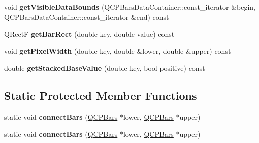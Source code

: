 \begin{DoxyCompactItemize}
\item 
\mbox{\label{class_q_c_p_bars_ac8b6b514a665a7bff4fb080413ba996a}} 
void {\bfseries get\+Visible\+Data\+Bounds} (Q\+C\+P\+Bars\+Data\+Container\+::const\+\_\+iterator \&begin, Q\+C\+P\+Bars\+Data\+Container\+::const\+\_\+iterator \&end) const
\item 
\mbox{\label{class_q_c_p_bars_a01b87e38e5d5089d214646d2af7896ea}} 
Q\+RectF {\bfseries get\+Bar\+Rect} (double key, double value) const
\item 
\mbox{\label{class_q_c_p_bars_ad87586cc5e9806740bc0e867667da409}} 
void {\bfseries get\+Pixel\+Width} (double key, double \&lower, double \&upper) const
\item 
\mbox{\label{class_q_c_p_bars_a0ffd6e043876e13e89eaa54e9f8a04b9}} 
double {\bfseries get\+Stacked\+Base\+Value} (double key, bool positive) const
\end{DoxyCompactItemize}
\subsection*{Static Protected Member Functions}
\begin{DoxyCompactItemize}
\item 
\mbox{\label{class_q_c_p_bars_a6ea37802cd22f97235cab614b14b9f19}} 
static void {\bfseries connect\+Bars} (\hyperlink{class_q_c_p_bars}{Q\+C\+P\+Bars} $\ast$lower, \hyperlink{class_q_c_p_bars}{Q\+C\+P\+Bars} $\ast$upper)
\item 
\mbox{\label{class_q_c_p_bars_a195e53438d6adaff6636dda7a744afa6}} 
static void {\bfseries connect\+Bars} (\hyperlink{class_q_c_p_bars}{Q\+C\+P\+Bars} $\ast$lower, \hyperlink{class_q_c_p_bars}{Q\+C\+P\+Bars} $\ast$upper)
\end{DoxyCompactItemize}
